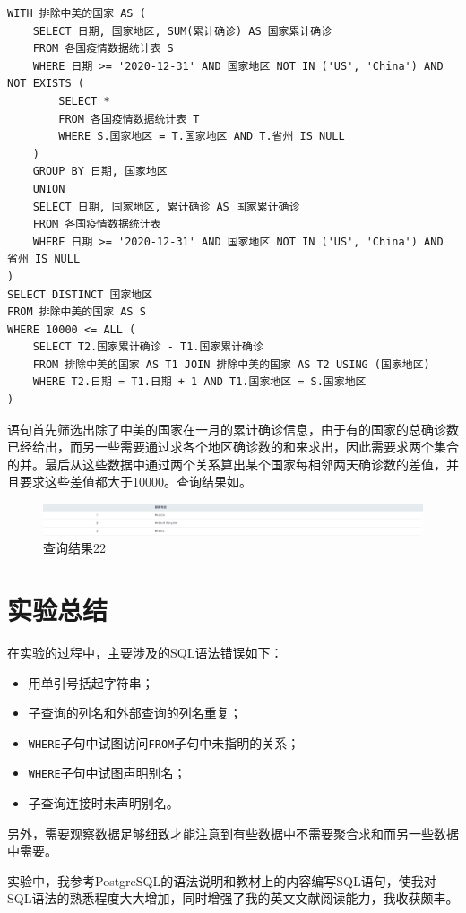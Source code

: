 \documentclass[lang=cn,11pt,a4paper,cite=authornum]{paper}
\begin{document}
\begin{code}
\begin{verbatim}
WITH 排除中美的国家 AS (
    SELECT 日期, 国家地区, SUM(累计确诊) AS 国家累计确诊
    FROM 各国疫情数据统计表 S
    WHERE 日期 >= '2020-12-31' AND 国家地区 NOT IN ('US', 'China') AND NOT EXISTS (
        SELECT *
        FROM 各国疫情数据统计表 T
        WHERE S.国家地区 = T.国家地区 AND T.省州 IS NULL
    )
    GROUP BY 日期, 国家地区
    UNION
    SELECT 日期, 国家地区, 累计确诊 AS 国家累计确诊
    FROM 各国疫情数据统计表
    WHERE 日期 >= '2020-12-31' AND 国家地区 NOT IN ('US', 'China') AND 省州 IS NULL
)
SELECT DISTINCT 国家地区
FROM 排除中美的国家 AS S
WHERE 10000 <= ALL (
    SELECT T2.国家累计确诊 - T1.国家累计确诊
    FROM 排除中美的国家 AS T1 JOIN 排除中美的国家 AS T2 USING (国家地区)
    WHERE T2.日期 = T1.日期 + 1 AND T1.国家地区 = S.国家地区
)
\end{verbatim}
\end{code}

语句首先筛选出除了中美的国家在一月的累计确诊信息，由于有的国家的总确诊数已经给出，而另一些需要通过求各个地区确诊数的和来求出，因此需要求两个集合的并。最后从这些数据中通过两个关系算出某个国家每相邻两天确诊数的差值，并且要求这些差值都大于10000。查询结果如。

\begin{figure}[!htb]
    \centering
    \includegraphics[width=\textwidth]{./images/lab1_query22.png}
    \caption{查询结果22\label{fig:query22}}
\end{figure}

\section{实验总结}

在实验的过程中，主要涉及的SQL语法错误如下：

\begin{itemize}
    \item 用单引号括起字符串；
    \item 子查询的列名和外部查询的列名重复；
    \item \texttt{WHERE}子句中试图访问\texttt{FROM}子句中未指明的关系；
    \item \texttt{WHERE}子句中试图声明别名；
    \item 子查询连接时未声明别名。
\end{itemize}

另外，需要观察数据足够细致才能注意到有些数据中不需要聚合求和而另一些数据中需要。

实验中，我参考PostgreSQL的语法说明和教材上的内容编写SQL语句，使我对SQL语法的熟悉程度大大增加，同时增强了我的英文文献阅读能力，我收获颇丰。
\end{document}
